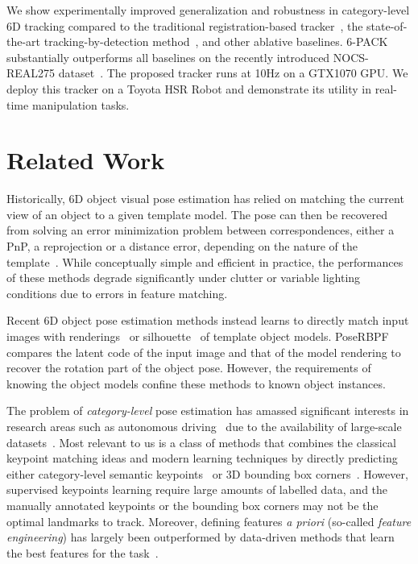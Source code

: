 \documentclass[letterpaper, 10 pt, conference]{ieeeconf}
\newcommand{\methodname}{\textsc{6-PACK}\xspace}
\begin{document}
We show experimentally improved generalization and robustness in category-level 6D tracking compared to the traditional registration-based tracker~\cite{segal2009generalized}, the state-of-the-art tracking-by-detection method~\cite{wang2019normalized}, and other ablative baselines. \methodname{} substantially outperforms all baselines on the recently introduced NOCS-REAL275 dataset~\cite{wang2019normalized}. The proposed tracker runs at 10Hz on a GTX1070 GPU. We deploy this tracker on a Toyota HSR Robot and demonstrate its utility in real-time manipulation tasks.

\section{Related Work}
\label{s:rw}

Historically, 6D object visual pose estimation has relied on matching the current view of an object to a given template model. The pose can then be recovered from solving an error minimization problem between correspondences, either a PnP, a reprojection or a distance error, depending on the nature of the template~\cite{collet2011moped, choi2010real, lepetit2004point, lepetit2006keypoint}. While conceptually simple and efficient in practice, the performances of these methods degrade significantly under clutter or variable lighting conditions due to errors in feature matching. 

Recent 6D object pose estimation methods instead learns to directly match input images with renderings~\cite{li2018deepim,deng2019poserbpf} or silhouette~\cite{hu2019segmentation,billings2018silhonet} of template object models. PoseRBPF~\cite{deng2019poserbpf} compares the latent code of the input image and that of the model rendering to recover the rotation part of the object pose. However, the requirements of knowing the object models confine these methods to known object instances. 

The problem of \textit{category-level} pose estimation has amassed significant interests in research areas such as autonomous driving~\cite{xu2017pointfusion,qi2018frustum,zhou2017voxelnet} due to the availability of large-scale datasets~\cite{kitti}. Most relevant to us is a class of methods that combines the classical keypoint matching ideas and modern learning techniques by directly predicting either category-level semantic keypoints~\cite{tulsiani2015viewpoints, pavlakos20176} or 3D bounding box corners~\cite{law2019cornernet,tekin18,tremblay2018deep}. However, supervised keypoints learning require large amounts of labelled data, and the manually annotated keypoints or the bounding box corners may not be the optimal landmarks to track. Moreover, defining features \textit{a priori} (so-called \textit{feature engineering}) has largely been outperformed by data-driven methods that learn the best features for the task~\cite{bengio2013representation}.
\end{document}
